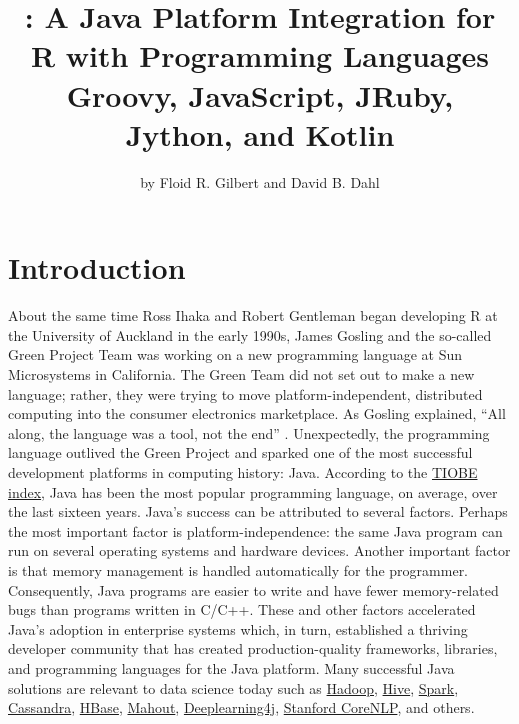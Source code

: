 \title{: A Java Platform Integration for R with Programming Languages Groovy, JavaScript, JRuby, Jython, and Kotlin}
\author{by Floid R. Gilbert and David B. Dahl}

\maketitle




\hypertarget{introduction}{}
\section{Introduction}

About the same time Ross Ihaka and Robert Gentleman began developing R at the University of Auckland in the early 1990s, James Gosling and the so-called Green Project Team was working on a new programming language at Sun Microsystems in California. The Green Team did not set out to make a new language; rather, they were trying to move platform-independent, distributed computing into the consumer electronics marketplace. As Gosling explained, ``All along, the language was a tool, not the end'' \citep{javainsidestory}. Unexpectedly, the programming language outlived the Green Project and sparked one of the most successful development platforms in computing history: Java. According to the \href{https://www.tiobe.com/tiobe-index/}{TIOBE index}, Java has been the most popular programming language, on average, over the last sixteen years. Java's success can be attributed to several factors. Perhaps the most important factor is platform-independence: the same Java program can run on several operating systems and hardware devices. Another important factor is that memory management is handled automatically for the programmer. Consequently, Java programs are easier to write and have fewer memory-related bugs than programs written in C/C++. These and other factors accelerated Java's adoption in enterprise systems which, in turn, established a thriving developer community that has created production-quality frameworks, libraries, and programming languages for the Java platform. Many successful Java solutions are relevant to data science today such as \href{http://hadoop.apache.org/}{Hadoop}, \href{https://hive.apache.org/}{Hive}, \href{https://spark.apache.org/}{Spark}, \href{http://cassandra.apache.org/}{Cassandra}, \href{https://hbase.apache.org/}{HBase}, \href{https://mahout.apache.org/}{Mahout}, \href{https://deeplearning4j.org/}{Deeplearning4j}, \href{https://stanfordnlp.github.io/CoreNLP/}{Stanford CoreNLP}, and others.

